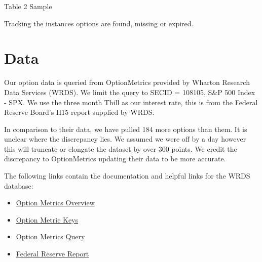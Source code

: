 \newpage 

\thispagestyle{empty}
\begin{landscape}

\begin{table}
    \centering
    \caption{ Table 2 Sample}
    
\resizebox{1.4\textwidth}{!}{
\hspace*{-4cm}
  
  }

  \caption*{Tracking the instances options are found, missing or expired.}
\label{tab:t2}
\end{table}
\vfill
\raisebox{-6.5cm}{\makebox[\linewidth]{\thepage}}
\end{landscape}
\newpage



\section{Data}

Our option data is queried from OptionMetrics provided by Wharton Research Data Services (WRDS). We limit the query to SECID = 108105, S\&P 500 Index - SPX. We use the three month Tbill as our interest rate, this is from the Federal Reserve Board's H15 report supplied by WRDS. 

In comparison to their data, we have pulled 184 more options than them. It is unclear where the discrepancy lies. We assumed we were off by a day however this will truncate or elongate the dataset by over 300 points. We credit the discrepancy to OptionMetrics updating their data to be more accurate. 

The following links contain the documentation and helpful links for the WRDS database: 
\begin{itemize}
\item \href{https://wrds-www.wharton.upenn.edu/pages/support/manuals-and-overviews/optionmetrics/wrds-overview-optionmetrics/}{Option Metrics Overview} 
\item \href{https://wrds-www.wharton.upenn.edu/data-dictionary/optionm_all/opprcd2023/ }{Option Metric Keys}
\item \href{https://wrds-www.wharton.upenn.edu/pages/get-data/optionmetrics/ivy-db-us/options/option-prices/}{Option Metrics Query} 
\item \href{https://wrds-www.wharton.upenn.edu/data-dictionary/frb_all/rates_daily/}{Federal Reserve Report} 
\end{itemize}






